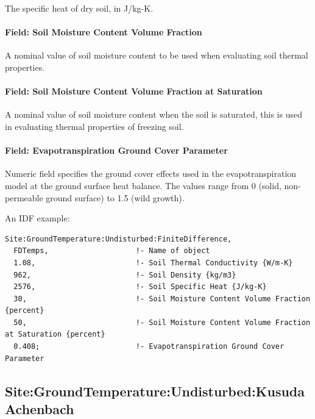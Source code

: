 The specific heat of dry soil, in J/kg-K.

\paragraph{Field: Soil Moisture Content Volume Fraction}\label{field-soil-moisture-content-volume-fraction}

A nominal value of soil moisture content to be used when evaluating soil thermal properties.

\paragraph{Field: Soil Moisture Content Volume Fraction at Saturation}\label{field-soil-moisture-content-volume-fraction-at-saturation}

A nominal value of soil moisture content when the soil is saturated, this is used in evaluating thermal properties of freezing soil.

\paragraph{Field: Evapotranspiration Ground Cover Parameter}\label{field-evapotranspiration-ground-cover-parameter}

Numeric field specifies the ground cover effects used in the evapotranspiration model at the ground surface heat balance. The values range from 0 (solid, non-permeable ground surface) to 1.5 (wild growth).

An IDF example:

\begin{lstlisting}
Site:GroundTemperature:Undisturbed:FiniteDifference,
  FDTemps,                    !- Name of object
  1.08,                       !- Soil Thermal Conductivity {W/m-K}
  962,                        !- Soil Density {kg/m3}
  2576,                       !- Soil Specific Heat {J/kg-K}
  30,                         !- Soil Moisture Content Volume Fraction {percent}
  50,                         !- Soil Moisture Content Volume Fraction at Saturation {percent}
  0.408;                      !- Evapotranspiration Ground Cover Parameter
\end{lstlisting}

\subsection{Site:GroundTemperature:Undisturbed:KusudaAchenbach}\label{sitegroundtemperatureundisturbedkusudaachenbach}


